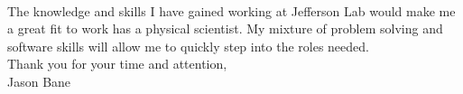 \documentclass[12pt,letterpaper]{article}
\begin{document}
\paragraph{}The knowledge and skills I have gained working at Jefferson Lab would make me a great fit to work has a physical scientist. My mixture of problem solving and software skills will allow me to quickly step into the roles needed.      
\\

\noindent Thank you for your time and attention,\\
\noindent Jason Bane
\end{document}
